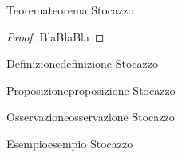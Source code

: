 \documentclass{article}
\begin{document}
\begin{theorem}{Teorema}{teorema}
    Stocazzo
\end{theorem}

\begin{proof}
    BlaBlaBla
\end{proof}

\begin{definition}{Definizione}{definizione}
    Stocazzo
\end{definition}

\begin{proposition}{Proposizione}{proposizione}
    Stocazzo
\end{proposition}

\begin{remark}{Osservazione}{osservazione}
    Stocazzo
\end{remark}

\begin{example}{Esempio}{esempio}
    Stocazzo
\end{example}
\end{document}
